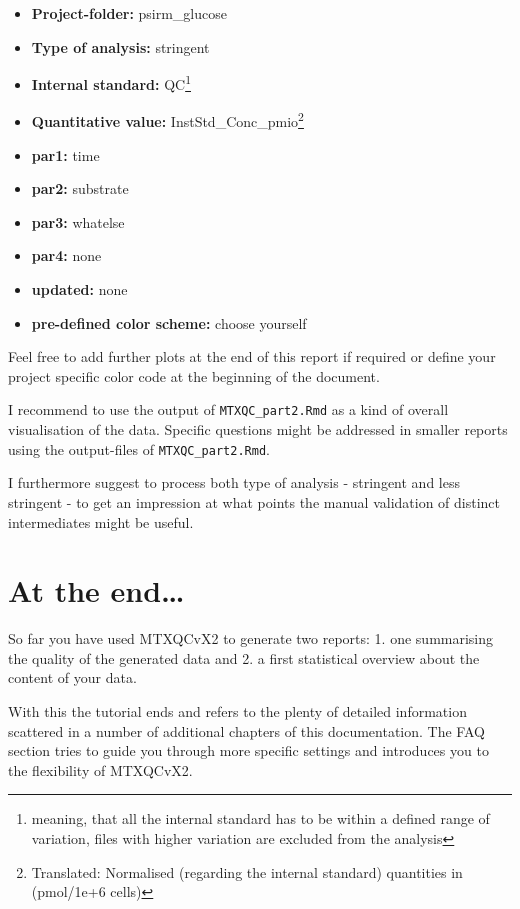 \documentclass[]{book}
\providecommand{\tightlist}{%
  \setlength{\itemsep}{0pt}\setlength{\parskip}{0pt}}
\let\rmarkdownfootnote\footnote%
\def\footnote{\protect\rmarkdownfootnote}
\theoremstyle{definition}
\theoremstyle{definition}
\theoremstyle{definition}
\theoremstyle{remark}
\begin{document}
\begin{itemize}
\tightlist
\item
  \textbf{Project-folder:} psirm\_glucose
\item
  \textbf{Type of analysis:} stringent
\item
  \textbf{Internal standard:} QC\footnote{meaning, that all the internal
    standard has to be within a defined range of variation, files with
    higher variation are excluded from the analysis}
\item
  \textbf{Quantitative value:} InstStd\_Conc\_pmio\footnote{Translated:
    Normalised (regarding the internal standard) quantities in
    (pmol/1e+6 cells)}
\item
  \textbf{par1:} time
\item
  \textbf{par2:} substrate
\item
  \textbf{par3:} whatelse
\item
  \textbf{par4:} none
\item
  \textbf{updated:} none
\item
  \textbf{pre-defined color scheme:} choose yourself
\end{itemize}

Feel free to add further plots at the end of this report if required or
define your project specific color code at the beginning of the
document.

I recommend to use the output of \texttt{MTXQC\_part2.Rmd} as a kind of
overall visualisation of the data. Specific questions might be addressed
in smaller reports using the output-files of \texttt{MTXQC\_part2.Rmd}.

I furthermore suggest to process both type of analysis - stringent and
less stringent - to get an impression at what points the manual
validation of distinct intermediates might be useful.

\section{At the end\ldots{}}\label{at-the-end}

So far you have used MTXQCvX2 to generate two reports: 1. one
summarising the quality of the generated data and 2. a first statistical
overview about the content of your data.

With this the tutorial ends and refers to the plenty of detailed
information scattered in a number of additional chapters of this
documentation. The FAQ section tries to guide you through more specific
settings and introduces you to the flexibility of MTXQCvX2.
\end{document}
